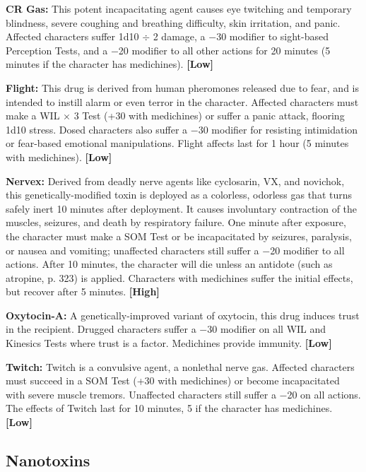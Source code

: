 \textbf{CR Gas:} This potent incapacitating agent causes eye twitching and temporary blindness, severe coughing and breathing difficulty, skin irritation, and panic. Affected characters suffer 1d10 $\div$ 2 damage, a $-$30 modifier to sight-based Perception Tests, and a $-$20 modifier to all other actions for 20 minutes (5 minutes if the character has medichines). \textbf{[Low]} 

\textbf{Flight:} This drug is derived from human pheromones released due to fear, and is intended to instill alarm or even terror in the character. Affected characters must make a WIL $\times$ 3 Test (+30 with medichines) or suffer a panic attack, flooring 1d10 stress. Dosed characters also suffer a $-$30 modifier for resisting intimidation or fear-based emotional manipulations. Flight affects last for 1 hour (5 minutes with medichines). \textbf{[Low]} 

\textbf{Nervex:} Derived from deadly nerve agents like cyclosarin, VX, and novichok, this genetically-modified toxin is deployed as a colorless, odorless gas that turns safely inert 10 minutes after deployment. It causes involuntary contraction of the muscles, seizures, and death by respiratory failure. One minute after exposure, the character must make a SOM Test or be incapacitated by seizures, paralysis, or nausea and vomiting; unaffected characters still suffer a $-$20 modifier to all actions. After 10 minutes, the character will die unless an antidote (such as atropine, p. 323) is applied. Characters with medichines suffer the initial effects, but recover after 5 minutes. \textbf{[High]} 

\textbf{Oxytocin-A:} A genetically-improved variant of oxytocin, this drug induces trust in the recipient. Drugged characters suffer a $-$30 modifier on all WIL and Kinesics Tests where trust is a factor. Medichines provide immunity. \textbf{[Low]} 

\textbf{Twitch:} Twitch is a convulsive agent, a nonlethal nerve gas. Affected characters must succeed in a SOM Test (+30 with medichines) or become incapacitated with severe muscle tremors. Unaffected characters still suffer a $-$20 on all actions. The effects of Twitch last for 10 minutes, 5 if the character has medichines. \textbf{[Low]} 



\subsection{Nanotoxins} \label{sec:nanotoxins} 

